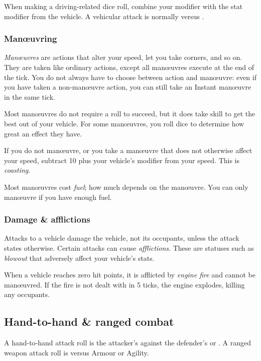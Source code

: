 \documentclass[10pt, a4paper, twocolumn]{article}
\begin{document}
When making a driving-related dice roll, combine your  modifier with the stat modifier from the vehicle. A vehicular attack is normally  versus .

\subsubsection{Man\oe{}uvring}
\emph{Man\oe{}uvres} are actions that alter your speed, let you take corners, and so on. They are taken like ordinary actions, except all man\oe{}uvres execute at the end of the tick. You do not always have to choose between action and man\oe{}uvre: even if you have taken a non-man\oe{}uvre action, you can still take an Instant man\oe{}uvre in the same tick.

Most man\oe{}uvres do not require a roll to succeed, but it does take skill to get the best out of your vehicle. For some man\oe{}uvres, you roll dice to determine how great an effect they have.

If you do not man\oe{}uvre, or you take a man\oe{}uvre that does not otherwise affect your speed, subtract 10 plus your vehicle's  modifier from your speed. This is \emph{coasting}.

Most man\oe{}uvres cost \emph{fuel}; how much depends on the man\oe{}uvre. You can only man\oe{}uvre if you have enough fuel.

\subsubsection{Damage \& afflictions}
Attacks to a vehicle damage the vehicle, not its occupants, unless the attack states otherwise. Certain attacks can cause \emph{afflictions}. These are statuses such as \emph{blowout} that adversely affect your vehicle's stats.

When a vehicle reaches zero hit points, it is afflicted by \emph{engine fire} and cannot be man\oe{}uvred. If the fire is not dealt with in 5 ticks, the engine explodes, killing any occupants.

\subsection{Hand-to-hand \& ranged combat}
A hand-to-hand attack roll is the attacker's  against the defender's  or . A ranged weapon attack roll is  versus Armour or Agility.
\end{document}
